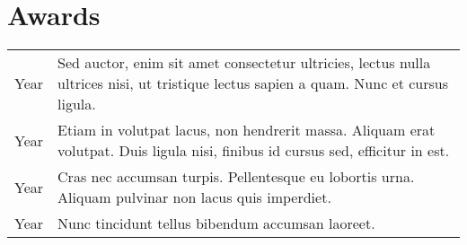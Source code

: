 \documentclass[]{deedy-resume-openfont}
\begin{document}
\begin{minipage}[t]{0.66\textwidth}
\section{Awards} 
\begin{tabular}{r p{10.95cm}}
Year    & Sed auctor, enim sit amet consectetur ultricies, lectus nulla ultrices nisi, ut tristique lectus sapien a quam. Nunc et cursus ligula. \\
Year    & Etiam in volutpat lacus, non hendrerit massa. Aliquam erat volutpat. Duis ligula nisi, finibus id cursus sed, efficitur in est. \\
Year    & Cras nec accumsan turpis. Pellentesque eu lobortis urna. Aliquam pulvinar non lacus quis imperdiet. \\
Year    & Nunc tincidunt tellus bibendum accumsan laoreet.
\end{tabular}
\sectionsep




%
%


\end{minipage} 
\end{document}
